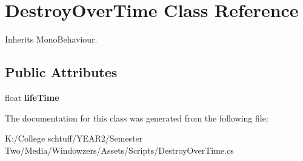 \hypertarget{class_destroy_over_time}{}\section{Destroy\+Over\+Time Class Reference}
\label{class_destroy_over_time}


Inherits Mono\+Behaviour.

\subsection*{Public Attributes}
\begin{DoxyCompactItemize}
\item 
\mbox{\label{class_destroy_over_time_ac39470f759959c6a93d096d04fb97e43}} 
float {\bfseries life\+Time}
\end{DoxyCompactItemize}


The documentation for this class was generated from the following file\+:\begin{DoxyCompactItemize}
\item 
K\+:/\+College schtuff/\+Y\+E\+A\+R2/\+Semester Two/\+Media/\+Windowzers/\+Assets/\+Scripts/Destroy\+Over\+Time.\+cs\end{DoxyCompactItemize}
